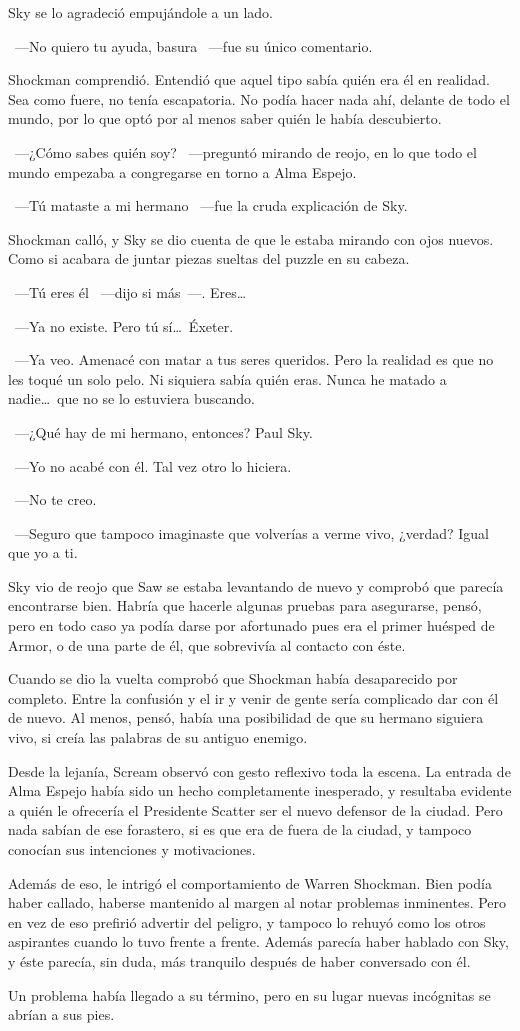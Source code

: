 Sky se lo agradeció empujándole a un lado.

~---No quiero tu ayuda, basura ~---fue su único comentario.

Shockman comprendió. Entendió que aquel tipo sabía quién era él en realidad. Sea como fuere, no tenía escapatoria. No podía hacer nada ahí, delante de todo el mundo, por lo que optó por al menos saber quién le había descubierto.

~---¿Cómo sabes quién soy? ~---preguntó mirando de reojo, en lo que todo el mundo empezaba a congregarse en torno a Alma Espejo.

~---Tú mataste a mi hermano ~---fue la cruda explicación de Sky.

Shockman calló, y Sky se dio cuenta de que le estaba mirando con ojos nuevos. Como si acabara de juntar piezas sueltas del puzzle en su cabeza.

~---Tú eres él ~---dijo si más~---. Eres\dots

~---Ya no existe. Pero tú sí\dots\ Éxeter.

~---Ya veo. Amenacé con matar a tus seres queridos. Pero la realidad es que no les toqué un solo pelo. Ni siquiera sabía quién eras. Nunca he matado a nadie\dots\ que no se lo estuviera buscando.

~---¿Qué hay de mi hermano, entonces? Paul Sky.

~---Yo no acabé con él. Tal vez otro lo hiciera.

~---No te creo.

~---Seguro que tampoco imaginaste que volverías a verme vivo, ¿verdad? Igual que yo a ti.

Sky vio de reojo que Saw se estaba levantando de nuevo y comprobó que parecía encontrarse bien. Habría que hacerle algunas pruebas para asegurarse, pensó, pero en todo caso ya podía darse por afortunado pues era el primer huésped de Armor, o de una parte de él, que sobrevivía al contacto con éste.

Cuando se dio la vuelta comprobó que Shockman había desaparecido por completo. Entre la confusión y el ir y venir de gente sería complicado dar con él de nuevo. Al menos, pensó, había una posibilidad de que su hermano siguiera vivo, si creía las palabras de su antiguo enemigo.

Desde la lejanía, Scream observó con gesto reflexivo toda la escena. La entrada de Alma Espejo había sido un hecho completamente inesperado, y resultaba evidente a quién le ofrecería el Presidente Scatter ser el nuevo defensor de la ciudad. Pero nada sabían de ese forastero, si es que era de fuera de la ciudad, y tampoco conocían sus intenciones y motivaciones.

Además de eso, le intrigó el comportamiento de Warren Shockman. Bien podía haber callado, haberse mantenido al margen al notar problemas inminentes. Pero en vez de eso prefirió advertir del peligro, y tampoco lo rehuyó como los otros aspirantes cuando lo tuvo frente a frente. Además parecía haber hablado con Sky, y éste parecía, sin duda, más tranquilo después de haber conversado con él.

Un problema había llegado a su término, pero en su lugar nuevas incógnitas se abrían a sus pies.

\endinput
